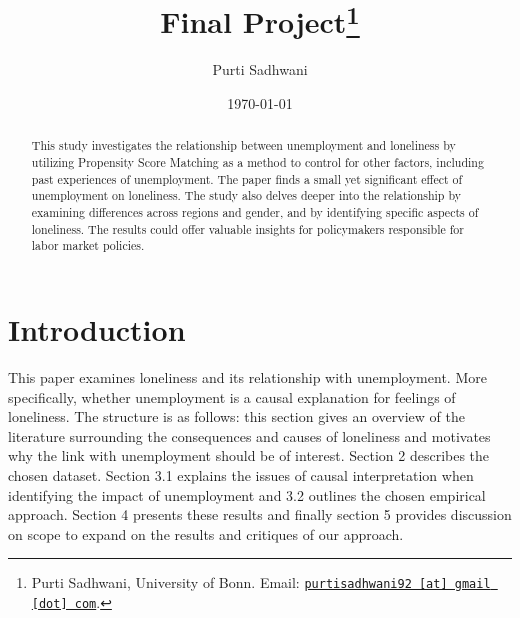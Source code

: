 \documentclass[11pt, a4paper, leqno]{article}
\begin{document}
\title{Final Project\thanks{Purti Sadhwani, University of Bonn. Email: \href{mailto:purtisadhwani92@gmail.com}{\nolinkurl{purtisadhwani92 [at] gmail [dot] com}}.}}

\author{Purti Sadhwani}

\date{
    \today
}

\maketitle


\begin{abstract}
    This study investigates the relationship between unemployment and loneliness by utilizing Propensity Score Matching as a method to control for other factors, including past experiences of unemployment. The  paper finds a small yet significant effect of unemployment on loneliness. The study also delves deeper into the relationship by examining differences across regions and gender, and by identifying specific aspects of loneliness. The results could offer valuable insights for policymakers responsible for labor market policies.
\end{abstract}

\clearpage


\section{Introduction} %
\label{sec:introduction}

This paper examines loneliness and its relationship with unemployment. More specifically, whether unemployment is a causal explanation for feelings of loneliness. The structure is as follows: this section gives an overview
of the literature surrounding the consequences and causes of loneliness and motivates why the link with unemployment should be of interest. Section 2 describes the chosen dataset. Section 3.1 explains the issues of causal
interpretation when identifying the impact of unemployment and 3.2 outlines the chosen empirical approach. Section 4 presents these results and finally section 5 provides discussion on scope to expand on the results and critiques of our approach.
\end{document}

